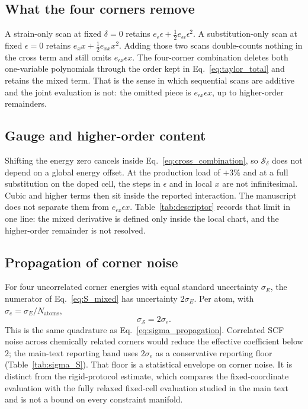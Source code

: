 \subsection{What the four corners remove}
\label{sec:why_four}

A strain-only scan at fixed $\delta=0$ retains $e_\epsilon\epsilon+\tfrac12 e_{\epsilon\epsilon}\epsilon^2$.
A substitution-only scan at fixed $\epsilon=0$ retains $e_x x+\tfrac12 e_{xx}x^2$.
Adding those two scans double-counts nothing in the cross term and still omits $e_{\epsilon x}\epsilon x$.
The four-corner combination deletes both one-variable polynomials through the order kept in Eq.~\eqref{eq:taylor_total} and retains the mixed term.
That is the sense in which sequential scans are additive and the joint evaluation is not: the omitted piece is $e_{\epsilon x}\epsilon x$, up to higher-order remainders.

\subsection{Gauge and higher-order content}
\label{sec:symmetry_gauge}

Shifting the energy zero cancels inside Eq.~\eqref{eq:cross_combination}, so $\mathcal{S}_\delta$ does not depend on a global energy offset.
At the production load of $+3\%$ and at a full substitution on the doped cell, the steps in $\epsilon$ and in local $x$ are not infinitesimal.
Cubic and higher terms then sit inside the reported interaction.
The manuscript does not separate them from $e_{\epsilon x}\epsilon x$.
Table~\ref{tab:descriptor} records that limit in one line: the mixed derivative is defined only inside the local chart, and the higher-order remainder is not resolved.

\subsection{Propagation of corner noise}
\label{sec:error_prop}

For four uncorrelated corner energies with equal standard uncertainty $\sigma_E$, the numerator of Eq.~\eqref{eq:S_mixed} has uncertainty $2\sigma_E$.
Per atom, with $\sigma_e=\sigma_E/N_{\mathrm{atoms}}$,
\begin{equation}
\sigma_{\mathcal{S}}=2\sigma_e.
\label{eq:sigma_propagation_si}
\end{equation}
This is the same quadrature as Eq.~\eqref{eq:sigma_propagation}.
Correlated SCF noise across chemically related corners would reduce the effective coefficient below $2$; the main-text reporting band uses $2\sigma_e$ as a conservative reporting floor (Table~\ref{tab:sigma_S}).
That floor is a statistical envelope on corner noise.
It is distinct from the rigid-protocol estimate, which compares the fixed-coordinate evaluation with the fully relaxed fixed-cell evaluation studied in the main text and is not a bound on every constraint manifold.
